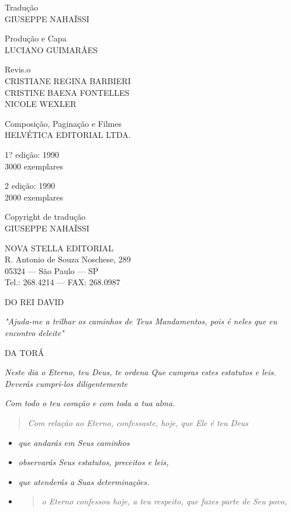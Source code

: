 Tradução\\
GIUSEPPE NAHAÏSSI

Produção e Capa\\
LUCIANO GUIMARÃES

Revis.o\\
CRISTIANE REGINA BARBIERI\\
CRISTINE BAENA FONTELLES\\
NICOLE WEXLER

Composição, Paginação e Filmes\\
HELVÉTICA EDITORIAL LTDA.

1? edição: 1990\\
3000 exemplares

2 edição: 1990\\
2000 exemplares

Copyright de tradução\\
GIUSEPPE NAHAÏSSI

NOVA STELLA EDITORIAL\\
R. Antonio de Souza Noschese, 289\\
05324 --- São Paulo --- SP\\
Tel.: 268.4214 --- FAX: 268.0987

DO REI DAVID

\emph{"Ajuda-me a trilhar os caminhos de Teus Man­damentos, pois é neles
que eu encontro deleite"}

DA TORÁ

\emph{Neste dia o Eterno, teu Deus, te ordena Que cumpras estes
estatutos e leis. Deverás cumpri-los diligentemente}

\emph{Com todo o teu coração e com toda a tua alma.}

\begin{quote}
\emph{Com relação ao Eterno, confessaste, hoje, que Ele é teu Deus}
\end{quote}

\begin{itemize}
\item
  \emph{que andarás em Seus caminhos}
\item
  \emph{observarás Seus estatutos, preceitos e leis,}
\item
  \emph{que atenderás a Suas determinações.}
\item
  \begin{quote}
  \emph{o Eterno confessou hoje, a teu respeito, que fazes parte de Seu
  povo,}
  \end{quote}
\end{itemize}

